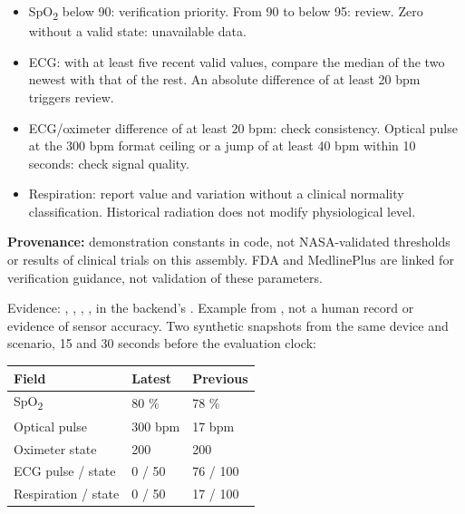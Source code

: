 \begin{itemize}
\item SpO\textsubscript{2} below 90: verification priority. From 90 to below 95: review. Zero without a valid state: unavailable data.
\item ECG: with at least five recent valid values, compare the median of the two newest with that of the rest. An absolute difference of at least 20 bpm triggers review.
\item ECG/oximeter difference of at least 20 bpm: check consistency. Optical pulse at the 300 bpm format ceiling or a jump of at least 40 bpm within 10 seconds: check signal quality.
\item Respiration: report value and variation without a clinical normality classification. Historical radiation does not modify physiological level.
\end{itemize}
\begin{infobox}\textbf{Provenance:} demonstration constants in code, not NASA-validated thresholds or results of clinical trials on this assembly. FDA and MedlinePlus are linked for verification guidance, not validation of these parameters.\end{infobox}
{\footnotesize\color{muted}Evidence: , , , , in the backend's .}
\newpage
{}
Example from , not a human record or evidence of sensor accuracy. Two synthetic snapshots from the same device and scenario, 15 and 30 seconds before the evaluation clock:
\par\noindent\begin{tabularx}{\linewidth}{@{}lXX@{}}
\toprule Field & Latest & Previous\\\midrule
SpO\textsubscript{2} & 80 \% & 78 \%\\
Optical pulse & 300 bpm & 17 bpm\\
Oximeter state & 200 & 200\\
ECG pulse / state & 0 / 50 & 76 / 100\\
Respiration / state & 0 / 50 & 17 / 100\\\bottomrule
\end{tabularx}\par
